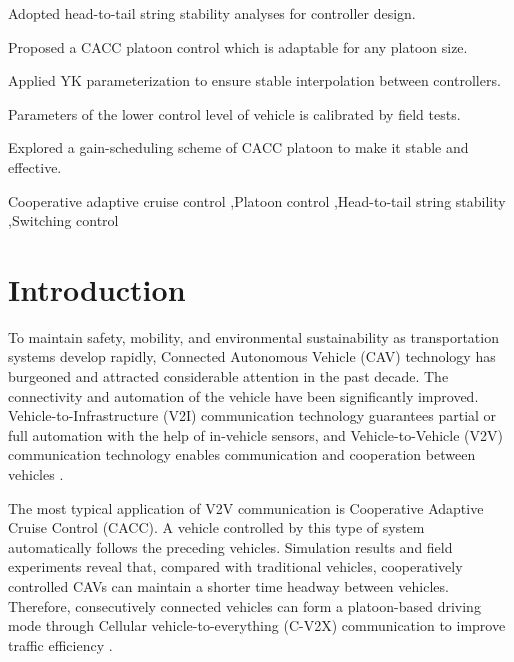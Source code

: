 \documentclass[a4paper,fleqn]{cas-sc}
\begin{document}
\begin{highlights}
  \item Adopted head-to-tail string stability analyses for controller design.
  \item Proposed a CACC platoon control which is adaptable for any platoon size.
  \item Applied YK parameterization to ensure stable interpolation between controllers.
  \item Parameters of the lower control level of vehicle is calibrated by field tests.
  \item Explored a gain-scheduling scheme of CACC platoon to make it stable and effective.
\end{highlights}

\begin{keywords}
  Cooperative adaptive cruise control \sep Platoon control \sep Head-to-tail string stability \sep Switching control
\end{keywords}


\maketitle

\section{Introduction}
\label{Section 1}
To maintain safety, mobility, and environmental sustainability as transportation systems develop rapidly, Connected Autonomous Vehicle (CAV) technology has burgeoned and attracted considerable attention in the past decade. The connectivity and automation of the vehicle have been significantly improved. Vehicle-to-Infrastructure (V2I) communication technology guarantees partial or full automation with the help of in-vehicle sensors, and Vehicle-to-Vehicle (V2V) communication technology enables communication and cooperation between vehicles \citep{wang2019survey,ploeg2011design,zhou2021impact}.

The most typical application of V2V communication is Cooperative Adaptive Cruise Control (CACC). A vehicle controlled by this type of system automatically follows the preceding vehicles. Simulation results and field experiments reveal that, compared with traditional vehicles, cooperatively controlled CAVs can maintain a shorter time headway between vehicles. Therefore, consecutively connected vehicles can form a platoon-based driving mode through Cellular vehicle-to-everything (C-V2X) communication to improve traffic efficiency \citep{gong2018cooperative,wang2020cooperative}.
\end{document}
